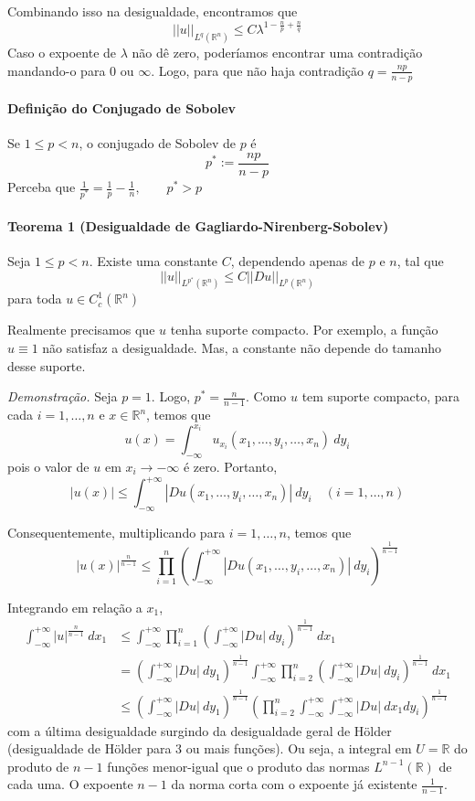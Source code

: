 \documentclass[11pt]{article}
\newcommand{\R}{\mathbb{R}}
\newcommand{\Rn}{{\mathbb{R}^n}}
\newcommand{\nor}[2]{||#1||_{#2}}
\begin{document}
Combinando isso na desigualdade, encontramos que \[ \nor{u}{L^q(\Rn)} \leq C \lambda^{1 - \frac{n}{p} + \frac{n}{q} }\] Caso o expoente de $\lambda$ não dê zero, poderíamos encontrar uma contradição mandando-o para 0 ou $\infty$. Logo, para que não haja contradição $ q = \frac{np}{n-p} $

\paragraph{Definição do Conjugado de Sobolev} Se $ 1\leq p < n $, o conjugado de Sobolev de $p$ é \[ p^* := \frac{np}{n-p} \] Perceba que $ \frac{1}{p^*} = \frac{1}{p} - \frac{1}{n}, \qquad p^* > p $


\paragraph{Teorema 1 (Desigualdade de Gagliardo-Nirenberg-Sobolev)}\label{t:sobolev-ineq-t1} Seja $ 1 \leq p < n $. Existe uma constante $C$, dependendo apenas de $p$ e $n$, tal que \[ ||u||_{L^{p^*}(\Rn)} \leq C \left|\left|Du\right|\right|_{L^{p}(\Rn)} \] para toda $u \in C^1_c(\Rn)$

Realmente precisamos que $u$ tenha suporte compacto. Por exemplo, a função $u \equiv 1$ não satisfaz a desigualdade. Mas, a constante não depende do tamanho desse suporte.

\textit{Demonstração.} Seja $p=1$. Logo, $p^* = \frac{n}{n-1}$. Como $u$ tem suporte compacto, para cada $i=1,\ldots,n$ e $x \in \Rn$, temos que \[ u(x) = \int_{-\infty}^{x_i} u_{x_i}(x_1, \ldots, y_i, \ldots, x_n) \ dy_i\] pois o valor de $u$ em $x_i \rightarrow -\infty$ é zero. Portanto, \[ |u(x)| \leq \int_{-\infty}^{+\infty} \left| Du(x_1, \ldots, y_i, \ldots, x_n) \right|\ dy_i \quad (i=1, \ldots, n)\]

Consequentemente, multiplicando para $i=1, \ldots, n$, temos que \[ |u(x)|^{\frac{n}{n-1}} \leq \prod_{i=1}^{n} \left( \int_{-\infty}^{+\infty} |Du(x_1, \ldots, y_i, \ldots, x_n)| \ dy_i \right)^{\frac{1}{n-1}}  \]

Integrando em relação a $x_1$, \begin{align*}
	\int_{-\infty}^{+\infty} |u|^{\frac{n}{n-1}}\ dx_1 &\leq \int_{-\infty}^{+\infty} \prod_{i=1}^{n} \left( \int_{-\infty}^{+\infty} |Du|\ dy_i \right)^{\frac{1}{n-1}}\ dx_1 \\
	&= \left( \int_{-\infty}^{+\infty} |Du|\ dy_1 \right)^{\frac{1}{n-1}} \int_{-\infty}^{+\infty} \prod_{i=2}^{n} \left( \int_{-\infty}^{+\infty} |Du|\ dy_i \right)^{\frac{1}{n-1}}\ dx_1 \\
	&\leq \left( \int_{-\infty}^{+\infty} |Du|\ dy_1 \right)^{\frac{1}{n-1}}  \left( \prod_{i=2}^{n} \int_{-\infty}^{+\infty} \int_{-\infty}^{+\infty} |Du|\ dx_1 dy_i \right)^{\frac{1}{n-1}} 
\end{align*} com a última desigualdade surgindo da desigualdade geral de Hölder (desigualdade de Hölder para 3 ou mais funções). Ou seja, a integral em $U=\R$ do produto de $n-1$ funções menor-igual que o produto das normas $L^{n-1}(\R)$  de cada uma. O expoente $n-1$ da norma corta com o expoente já existente \( \frac{1}{n-1} \).
\end{document}
